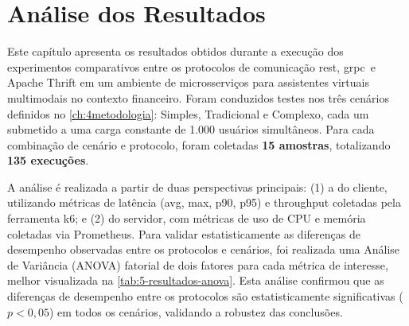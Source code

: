 \chapter{Análise dos Resultados}
\label{ch:5resultados}

Este capítulo apresenta os resultados obtidos durante a execução dos experimentos comparativos entre os protocolos de comunicação \gls{rest}, \gls{grpc}~e Apache Thrift em um ambiente de microsserviços para assistentes virtuais multimodais no contexto financeiro. Foram conduzidos testes nos três cenários definidos no \autoref{ch:4metodologia}: Simples, Tradicional e Complexo, cada um submetido a uma carga constante de 1.000 usuários simultâneos. Para cada combinação de cenário e protocolo, foram coletadas \textbf{15 amostras}, totalizando \textbf{135 execuções}. 

A análise é realizada a partir de duas perspectivas principais: (1) a do cliente, utilizando métricas de latência (avg, max, p90, p95) e throughput coletadas pela ferramenta k6; e (2) do servidor, com métricas de uso de CPU e memória coletadas via Prometheus. Para validar estatisticamente as diferenças de desempenho observadas entre os protocolos e cenários, foi realizada uma Análise de Variância (ANOVA) fatorial de dois fatores para cada métrica de interesse, melhor visualizada na \autoref{tab:5-resultados-anova}. Esta análise confirmou que as diferenças de desempenho entre os protocolos são estatisticamente significativas (\(p < 0,05\)) em todos os cenários, validando a robustez das conclusões.

